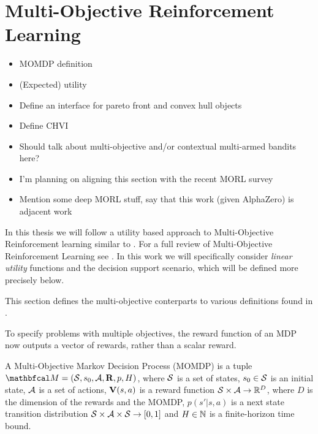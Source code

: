 \section{Multi-Objective Reinforcement Learning}
\label{sec:2-4-morl}
    
    \begin{itemize}
        \item MOMDP definition
        \item (Expected) utility
        \item Define an interface for pareto front and convex hull objects
        \item Define CHVI
        \item Should talk about multi-objective and/or contextual multi-armed bandits here?
        \item I'm planning on aligning this section with the recent MORL survey \cite{morl_survey}
        \item Mention some deep MORL stuff, say that this work (given AlphaZero) is adjacent work
    \end{itemize}



    In this thesis we will follow a utility based approach to Multi-Objective Reinforcement learning similar to . For a full review of Multi-Objective Reinforcement Learning see . In this work we will specifically consider \textit{linear utility} functions and the decision support scenario, which will be defined more precisely below.

    This section defines the multi-objective conterparts to various definitions found in .

    To specify problems with multiple objectives, the reward function of an MDP now outputs a vector of rewards, rather than a scalar reward.

    \begin{defn}
        \label{def:mo_mdp}
        A \textnormal{Multi-Objective Markov Decision Process} (MOMDP) is a tuple $\bfcl{M}=(\cl{S},s_0,\cl{A},\bff{R},p,H)$, where $\mathcal{S}$ is a set of states, $s_0\in\mathcal{S}$ is an initial state, $\mathcal{A}$ is a set of actions, $\mathbf{V}(s,a)$ is a reward function $\mathcal{S}\times \mathcal{A}\rightarrow \mathbb{R}^D$, where $D$ is the dimension of the rewards and the MOMDP, $p(s' | s,a)$ is a next state transition distribution $\mathcal{S} \times \mathcal{A} \times \mathcal{S} \rightarrow [0,1]$ and $H\in\mathbb{N}$ is a finite-horizon time bound.
    \end{defn}

